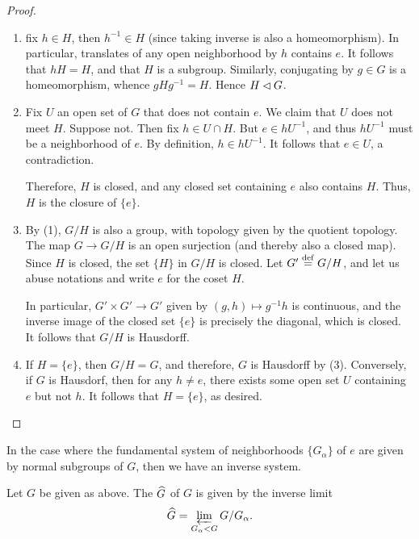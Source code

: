 \begin{proof}
\begin{enumerate}
\item fix $h \in H$, then $h^{-1} \in H$ (since taking inverse is 
also a homeomorphism). In particular, translates of any open 
neighborhood by $h$ contains $e$. It follows that $hH = H$, and 
that $H$ is a subgroup. Similarly, conjugating by $g \in G$ is a 
homeomorphism, whence $gHg^{-1} = H$. Hence $H \lhd G$.

\item Fix $U$ an open set of $G$ that does not contain $e$. We
claim that $U$ does not meet $H$. Suppose not. Then fix $h \in U 
\cap H$. But $e \in hU^{-1}$, and thus $hU^{-1}$ must be a 
neighborhood of $e$. By definition, $h \in hU^{-1}$. It follows
that $e \in U$, a contradiction.

Therefore, $H$ is closed, and any closed set containing $e$
also contains $H$. Thus, $H$ is the closure of $\{e\}$.

\item By (1), $G/H$ is also a group, with topology given by the
quotient topology. The map $G \to G/H$ is an open surjection (and 
thereby also a closed map). Since $H$ is closed, the set $\{H\}$ 
in $G/H$ is closed. Let $G' \stackrel{\mathrm{def}}{=} G/H$, and let us abuse 
notations and write $e$ for the coset $H$.

In particular, $G' \times G' \to G'$ given by $(g, h) \mapsto 
g^{-1}h$ is continuous, and the inverse image of the closed set 
$\{e\}$ is precisely the diagonal, which is closed. It follows 
that $G/H$ is Hausdorff.

\item If $H = \{e\}$, then $G/H = G$, and therefore, $G$ is Hausdorff
by (3). Conversely, if $G$ is Hausdorf, then for any $h \neq e$,
there exists some open set $U$ containing $e$ but not $h$. It
follows that $H = \{e\}$, as desired.
\end{enumerate}
\end{proof}

In the case where the fundamental system of neighborhoods 
$\{G_\alpha\}$ of $e$ are given by normal subgroups of $G$, then 
we have an inverse system.

\begin{defn}
Let $G$ be given as above. The 
$\widehat{G}$ of $G$ is given by the inverse limit
\[
\widehat{G} = \varprojlim_{G_\alpha < G} G/G_\alpha.
\]
\end{defn}

